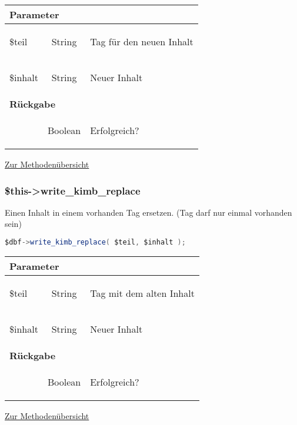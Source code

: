 \documentclass[paper=A4,pagesize=auto,12pt,headinclude=true,footinclude=true,BCOR=0mm,DIV=calc]{scrartcl}
\begin{document}
	    \begin{tabular}{|lcp{}|}
		    \hline
		      \multicolumn{3}{|l|}{ \textbf{Parameter} } \\
		    \hline
		      \$teil & String & \begin{itshape} Tag für den neuen Inhalt \end{itshape} \\
		      \$inhalt & String & \begin{itshape} Neuer Inhalt \end{itshape} \\
		    \hline
		      \multicolumn{3}{|l|}{ \textbf{Rückgabe} } \\
		    \hline
			     & Boolean & \begin{itshape} Erfolgreich? \end{itshape} \\
		    \hline
	    \end{tabular}
	    \begin{flushright} \small \hyperref[tab:methodenuerbersicht]{Zur Methodenübersicht} \end{flushright}
  
  \subsubsection{\$this->write\_kimb\_replace}
  \label{sec:mth_replace}
	    Einen Inhalt in einem vorhanden Tag ersetzen. (Tag darf nur einmal vorhanden sein)
	    \begin{lstlisting}[gobble=4,language=Java]
	      $dbf->write_kimb_replace( $teil, $inhalt );
	    \end{lstlisting}
	    
	    \begin{tabular}{|lcp{}|}
		    \hline
		      \multicolumn{3}{|l|}{ \textbf{Parameter} } \\
		    \hline
		      \$teil & String & \begin{itshape} Tag mit dem alten Inhalt \end{itshape} \\
		      \$inhalt & String & \begin{itshape} Neuer Inhalt \end{itshape} \\
		    \hline
		      \multicolumn{3}{|l|}{ \textbf{Rückgabe} } \\
		    \hline
			     & Boolean & \begin{itshape} Erfolgreich? \end{itshape} \\
		    \hline
	    \end{tabular}
	    \begin{flushright} \small \hyperref[tab:methodenuerbersicht]{Zur Methodenübersicht} \end{flushright}
  
\end{document}
